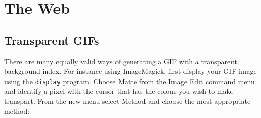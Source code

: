 \documentclass[twoside,11pt]{article}
\newcommand{\htmlref}[2]{#1}
\newcommand{\xlabel}[1]{}
\begin{document}



\section{\xlabel{sc15_web}The Web\label{sc15_web}}





\subsection{\xlabel{sc15_transpart}Transparent GIFs\label{sc15_transparent}}

There are many equally valid ways of generating a GIF with a
transparent background index. For instance using
\htmlref{ImageMagick}{sc15_magick}, first display your GIF image using
the {\tt display} program. Choose {\sc Matte} from the {\sc Image
Edit} command menu and identify a pixel with the cursor that has the
colour you wish to make transpart. From the new menu select {\sc
Method} and choose the most appropriate method:
\end{document}
